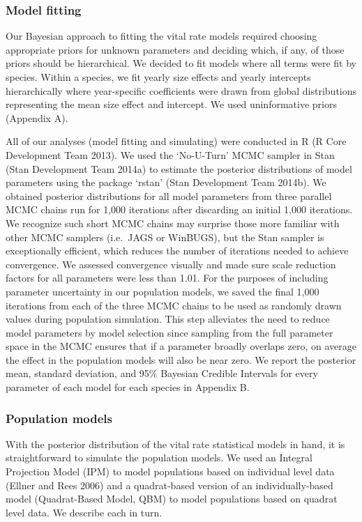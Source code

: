 \documentclass[12pt,]{article}
\begin{document}
\subsubsection{Model fitting}\label{model-fitting}

Our Bayesian approach to fitting the vital rate models required choosing
appropriate priors for unknown parameters and deciding which, if any, of
those priors should be hierarchical. We decided to fit models where all
terms were fit by species. Within a species, we fit yearly size effects
and yearly intercepts hierarchically where year-specific coefficients
were drawn from global distributions representing the mean size effect
and intercept. We used uninformative priors (Appendix A).

All of our analyses (model fitting and simulating) were conducted in R
(R Core Development Team 2013). We used the `No-U-Turn' MCMC sampler in
Stan (Stan Development Team 2014a) to estimate the posterior
distributions of model parameters using the package `rstan' (Stan
Development Team 2014b). We obtained posterior distributions for all
model parameters from three parallel MCMC chains run for 1,000
iterations after discarding an initial 1,000 iterations. We recognize
such short MCMC chains may surprise those more familiar with other MCMC
samplers (i.e.~JAGS or WinBUGS), but the Stan sampler is exceptionally
efficient, which reduces the number of iterations needed to achieve
convergence. We assessed convergence visually and made sure scale
reduction factors for all parameters were less than 1.01. For the
purposes of including parameter uncertainty in our population models, we
saved the final 1,000 iterations from each of the three MCMC chains to
be used as randomly drawn values during population simulation. This step
alleviates the need to reduce model parameters by model selection since
sampling from the full parameter space in the MCMC ensures that if a
parameter broadly overlaps zero, on average the effect in the population
models will also be near zero. We report the posterior mean, standard
deviation, and 95\% Bayesian Credible Intervals for every parameter of
each model for each species in Appendix B.

\subsubsection{Population models}\label{population-models}

With the posterior distribution of the vital rate statistical models in
hand, it is straightforward to simulate the population models. We used
an Integral Projection Model (IPM) to model populations based on
individual level data (Ellner and Rees 2006) and a quadrat-based version
of an individually-based model (Quadrat-Based Model, QBM) to model
populations based on quadrat level data. We describe each in turn.
\end{document}
